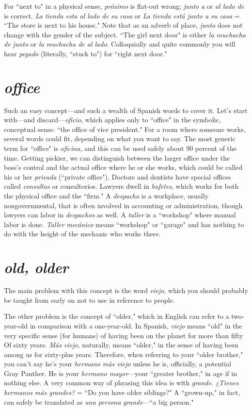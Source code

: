 For ``next to" in a physical sense, \emph{próximo} is flat-out wrong;
\emph{junto a} or \emph{al lado de} is correct. \emph{La tienda esta al lado de su casa} or \emph{La
	tienda está junto a su casa} = ``The store is next to his house." Note
that as an adverb of place, \emph{junto} does not change with the gender of
the subject. ``The girl next door" is either \emph{la muchacha de junto} or \emph{la
	muchacha de al lado}. Colloquially and quite commonly you will hear
\emph{pegado} (literally, ``stuck to") for ``right next door."

\section{\emph{office}}

Such an easy concept---and such a wealth of Spanish words to
cover it. Let's start with---and discard---\emph{oficio}, which applies only to
``office" in the symbolic, conceptual sense: ``the office of vice president." For a room where someone works, several words could fit, depending on what you want to say. The most generic term for ``office" is
\emph{oficina}, and this can be used safely about 90 percent of the time. Getting pickier, we can distinguish between the larger office under the
boss's control and the actual office where he or she works, which could
be called his or her \emph{privada} (``private office"). Doctors and dentists
have special offices called \emph{consultas} or consultorios. Lawyers dwell in
\emph{bufetes}, which works for both the physical office and the ``firm." A
\emph{despacho} is a workplace, usually nongovernmental, that is often involved in accounting or administration, though lawyers can labor in
\emph{despachos} as well. A \emph{taller} is a ``workshop" where manual labor is
done. \emph{Taller mecánico} means ``workshop" or ``garage" and has nothing
to do with the height of the mechanic who works there.

\section{\emph{old, older}}

The main problem with this concept is the word \emph{viejo}, which
you should probably be taught from early on not to use in reference
to people.

The other problem is the concept of ``older," which in English
can refer to a two-year-old in comparison with a one-year-old. In Spanish, \emph{viejo} means ``old" in the very specific sense (for humans) of having
been on the planet for more than fifty Of sixty years. \emph{Más viejo}, naturally, means ``older," in the sense of having been among us for sixty-plus years. Therefore, when referring to your ``older brother," you can't
say he's your \emph{hermano más viejo} unless he is, officially, a potential
Gray Panther. He is your \emph{hermano mayor}---your ``greater brother," in
age if in nothing else. A very common way of phrasing this idea is with
\emph{grande}. \emph{¿Tienes hermanos más grandes?} = ``Do you have older siblings?" A ``grown-up," in fact, can safely be translated as \emph{una persona
	grande}---``a big person."

